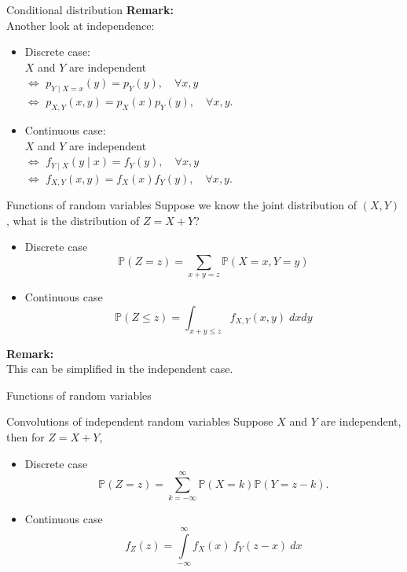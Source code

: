 \documentclass [aspectratio=169]{beamer}
\begin{document}
\begin{frame}{Conditional distribution}
\textbf{Remark:}\\
 Another look at independence: \\
 \vspace{0.1in}
 \begin{itemize}
     \item Discrete case:\\
     \quad $X$ and $Y$ are independent \\
     $\Leftrightarrow$ $ p_{Y\mid X = x}(y) = p_Y(y), \quad \forall x,y$\\
     $\Leftrightarrow$ $p_{X,Y}(x,y) = p_X(x)p_Y(y), \quad \forall x,y$.
     \vspace{0.1in}
     \item Continuous case:\\
      \quad $X$ and $Y$ are independent \\
     $\Leftrightarrow$ $ f_{Y\mid X}(y\mid x) = f_Y(y), \quad \forall x,y$\\
     $\Leftrightarrow$ $f_{X,Y}(x,y) = f_X(x)f_Y(y), \quad \forall x,y$.
 \end{itemize}
\end{frame}

\begin{frame}{Functions of random variables}
    Suppose we know the joint distribution of $(X, Y)$, what is the distribution of $Z = X+ Y$?
    \begin{itemize}
        \item Discrete case
        $$
        \mathbb{P}(Z = z) = \sum_{x+y=z}\mathbb{P}(X = x, Y = y)
        $$
        \item Continuous case
        $$
        \mathbb{P}(Z \le z) = \int_{x+y \le z} f_{X,Y}(x,y) \; dx dy
        $$
    \end{itemize}
    \vspace{0.1in}
    \textbf{Remark:}\\
This can be simplified in the independent case.
\end{frame}



\begin{frame}{Functions of random variables}
    \begin{block}{Convolutions of independent random variables}
    Suppose $X$ and $Y$ are independent, then for $Z = X+Y$, 
    \begin{itemize}
        \item Discrete case
        $$
        {\mathbb{P}(Z=z)=\sum _{k=-\infty }^{\infty }\mathbb{P}(X=k)\mathbb{P}(Y=z-k)}.
        $$
        \item Continuous case
        $$
        {\displaystyle f_{Z}(z)=\int \limits _{-\infty }^{\infty }f_{X}(x)~f_{Y}(z-x)~dx}
        $$
    \end{itemize}
    \end{block}
    
 \vspace{0.5in}
\end{frame}
\end{document}
